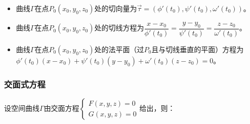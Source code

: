 \documentclass[UTF8, 12pt]{ctexart}
\begin{document}
\begin{itemize}
    \item 曲线$\varGamma$在点$P_0(x_0,y_0,z_0)$处的切向量为$\vec{\tau}=(\phi'(t_0),\psi'(t_0),\omega'(t_0))$。
    \item 曲线$\varGamma$在点$P_0(x_0,y_0,z_0)$处的切线方程为$\dfrac{x-x_0}{\phi'(t_0)}=\dfrac{y-y_0}{\psi'(t_0)}=\dfrac{z-z_0}{\omega'(t_0)}$。
    \item 曲线$\varGamma$在点$P_0(x_0,y_0,z_0)$处的法平面（过$P_0$且与切线垂直的平面）方程为$\phi'(t_0)(x-x_0)+\psi'(t_0)(y-y_0)+\omega'(t_0)(z-z_0)=0$。
\end{itemize}

\subsubsection{交面式方程}

设空间曲线$\varGamma$由交面方程$\left\{\begin{array}{l}
    F(x,y,z)=0 \\
    G(x,y,z)=0
\end{array}\right.$给出，则：
\end{document}
